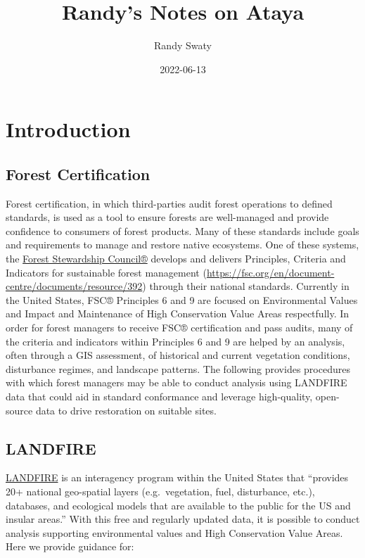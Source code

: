 \documentclass[
]{book}
\title{Randy's Notes on Ataya}
\author{Randy Swaty}
\date{2022-06-13}
\begin{document}
\maketitle

{
\setcounter{tocdepth}{1}
\tableofcontents
}
\hypertarget{Introduction}{%
\chapter{Introduction}\label{Introduction}}

\hypertarget{forest-certification}{%
\section{Forest Certification}\label{forest-certification}}

Forest certification, in which third-parties audit forest operations to defined standards, is used as a tool to ensure forests are well-managed and provide confidence to consumers of forest products. Many of these standards include goals and requirements to manage and restore native ecosystems. One of these systems, the \href{FSC®}{Forest Stewardship Council®} develops and delivers Principles, Criteria and Indicators for sustainable forest management (\url{https://fsc.org/en/document-centre/documents/resource/392}) through their national standards. Currently in the United States, FSC® Principles 6 and 9 are focused on Environmental Values and Impact and Maintenance of High Conservation Value Areas respectfully. In order for forest managers to receive FSC® certification and pass audits, many of the criteria and indicators within Principles 6 and 9 are helped by an analysis, often through a GIS assessment, of historical and current vegetation conditions, disturbance regimes, and landscape patterns. The following provides procedures with which forest managers may be able to conduct analysis using LANDFIRE data that could aid in standard conformance and leverage high-quality, open-source data to drive restoration on suitable sites.

\hypertarget{landfire}{%
\section{LANDFIRE}\label{landfire}}

\href{https://landfire.gov/}{LANDFIRE} is an interagency program within the United States that ``provides 20+ national geo-spatial layers (e.g.~vegetation, fuel, disturbance, etc.), databases, and ecological models that are available to the public for the US and insular areas.'' With this free and regularly updated data, it is possible to conduct analysis supporting environmental values and High Conservation Value Areas. Here we provide guidance for:
\end{document}
